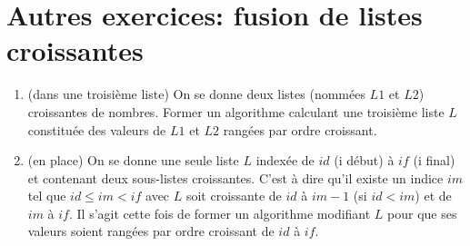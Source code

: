 \section{Autres exercices: fusion de listes croissantes}
\begin{enumerate}
  \item (dans une troisième liste) On se donne deux listes (nommées $L1$ et $L2$) croissantes de nombres. Former un algorithme calculant une troisième liste $L$ constituée des valeurs de $L1$ et $L2$ rangées par ordre croissant.
  
  \item (en place) On se donne une seule liste $L$ indexée de $id$ (i début) à $if$ (i final) et contenant deux sous-listes croissantes. C'est à dire qu'il existe un indice $im$ tel que $id \leq im < if$ avec $L$ soit croissante de $id$ à $im -1$ (si $id < im$) et de $im$ à $if$. Il s'agit cette fois de former un algorithme modifiant $L$ pour que ses valeurs soient rangées par ordre croissant de $id$ à $if$.
\end{enumerate}


